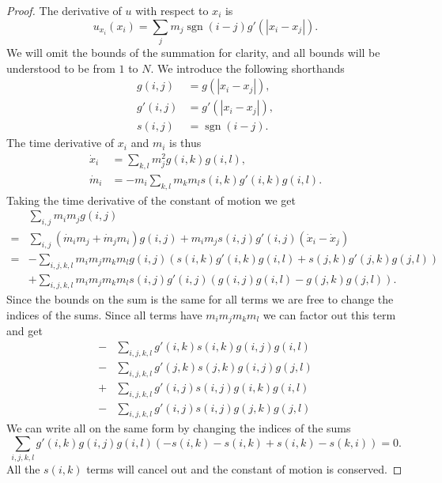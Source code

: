 \documentclass[english,master]{liumaiex}
\theoremstyle{plain}
\theoremstyle{definition}
\DeclareMathOperator{\sgn}{sgn}
\begin{document}
\begin{proof}
	The derivative of $u$ with respect to $x_i$ is
	\begin{equation}
		u_{x_i}(x_i) = \sum_j m_j \sgn(i - j) g'(|x_i - x_j|).
	\end{equation}
	We will omit the bounds of the summation for clarity, and all bounds will be understood to be from $1$ to $N$. We introduce the following shorthands
	\begin{equation}
	\begin{aligned}
		g(i,j) &= g(|x_i - x_j|),\\
		g'(i,j) &= g'(|x_i - x_j|),\\
		s(i,j) &= \sgn(i - j).
	\end{aligned}
	\end{equation}
	The time derivative of $x_i$ and $m_i$ is thus
	\begin{equation}
	\begin{aligned}
		\dot{x}_i &= \sum_{k,l} m_j^2 g(i,k) g(i,l),\\
		\dot{m}_i &= -m_i \sum_{k,l} m_k m_l s(i,k) g'(i,k) g(i,l).
	\end{aligned}
	\end{equation}
	Taking the time derivative of the constant of motion we get
	\begin{equation}
	\begin{aligned}
		&\sum_{i,j} m_i m_j g(i,j) \\
		=& \sum_{i,j} (\dot{m}_i m_j + \dot{m}_j m_i) g(i,j) + m_i m_j s(i,j) g'(i,j) (\dot{x}_i - \dot{x}_j) \\
		=& - \sum_{i,j,k,l} m_i m_j m_k m_l g(i,j) (s(i,k) g'(i,k) g(i,l) + s(j,k) g'(j,k) g(j,l)) \\
		&+ \sum_{i,j,k,l} m_i m_j m_k m_l s(i,j) g'(i,j) (g(i,j) g(i,l) - g(j,k) g(j,l)).
	\end{aligned}
	\end{equation}
	Since the bounds on the sum is the same for all terms we are free to change the indices of the sums. Since all terms have $m_i m_j m_k m_l$ we can factor out this term and get
	\begin{equation}
	\begin{aligned}
		-&\sum_{i,j,k,l} g'(i,k)s(i,k)g(i,j)g(i,l) \\
		-&\sum_{i,j,k,l} g'(j,k)s(j,k)g(i,j)g(j,l) \\
		+&\sum_{i,j,k,l} g'(i,j)s(i,j)g(i,k)g(i,l) \\
		-&\sum_{i,j,k,l} g'(i,j)s(i,j)g(j,k)g(j,l)
	\end{aligned}
	\end{equation}
	We can write all on the same form by changing the indices of the sums
	\begin{equation}
		\sum_{i,j,k,l} g'(i,k)g(i,j)g(i,l) (- s(i,k) - s(i,k) + s(i,k) - s(k,i)) = 0.
	\end{equation}
	All the $s(i,k)$ terms will cancel out and the constant of motion is conserved.
\end{proof}
\end{document}
